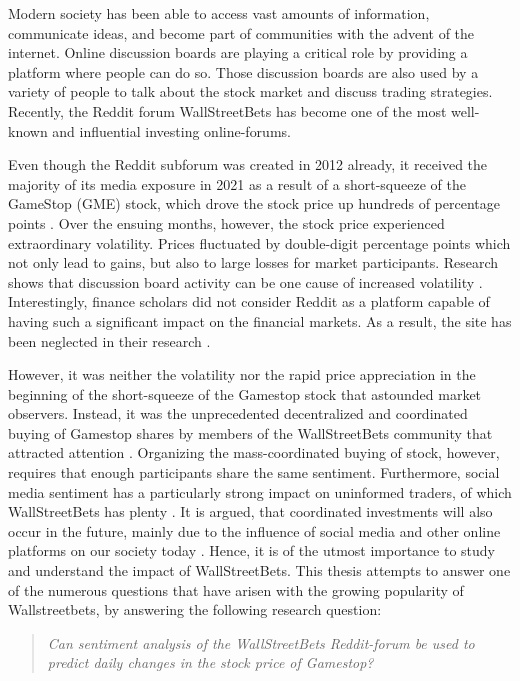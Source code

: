 \documentclass[11pt, a4paper]{article}
\begin{document}
Modern society has been able to access vast amounts of information, communicate ideas, and become part of communities with the advent of the internet. 
Online discussion boards are playing a critical role by providing a platform where people can do so. Those discussion boards are also used by a 
variety of people to talk about the stock market and discuss trading strategies. Recently, the Reddit forum WallStreetBets has become one of 
the most well-known and influential investing online-forums.

Even though the Reddit subforum was created in 2012 already, it received the majority of its media exposure in 2021 as a result of a short-squeeze 
of the GameStop (GME) stock, which drove the stock price up hundreds of percentage points \citep{diangson2021betonreddit}. Over the ensuing months, however, 
the stock price experienced extraordinary volatility. Prices fluctuated by double-digit percentage points which not only lead to gains, but also to large losses
for market participants. Research shows that discussion board activity can be one cause of increased volatility \citep{das2007yahoo}.
Interestingly, finance scholars did not consider Reddit as a platform capable of having such a significant impact on the financial markets. 
As a result, the site has been neglected in their research \citep{long2021LikeTheStock}.

However, it was neither the volatility nor the rapid price appreciation in the beginning of the short-squeeze of the Gamestop stock that astounded market observers. 
Instead, it was the unprecedented decentralized and coordinated buying of Gamestop shares by members of the WallStreetBets 
community that attracted attention \citep{anand2021WallstreetbetsAgainstWallstreet}.
Organizing the mass-coordinated buying of stock, however, requires that enough participants share the same sentiment. Furthermore, 
social media sentiment has a particularly strong impact on uninformed traders, of which WallStreetBets has plenty \citep{danbolt2015InvestorSentiment}. It is argued, that coordinated investments will also
occur in the future, mainly due to the influence of social media and other online platforms on our society today \citep{semenova2021reddits}. Hence, it is of the utmost importance
to study and understand the impact of WallStreetBets. This thesis attempts to answer one of the numerous questions that have arisen with the 
growing popularity of Wallstreetbets, by answering the following research question:

\begin{quote}
\emph{Can sentiment analysis of the WallStreetBets Reddit-forum be used to predict daily changes in the stock price of Gamestop?}
\end{quote}
\end{document}
